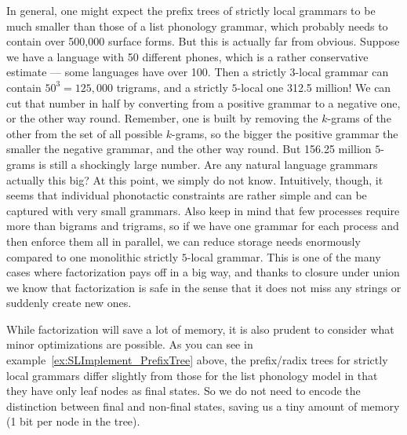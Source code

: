 In general, one might expect the prefix trees of strictly local grammars to be much smaller than those of a list phonology grammar, which probably needs to contain over 500,000 surface forms.
But this is actually far from obvious.
Suppose we have a language with 50 different phones, which is a rather conservative estimate --- some languages have over 100.
Then a strictly $3$-local grammar can contain $50^3 = 125,000$ trigrams, and a strictly $5$-local one 312.5 million!
We can cut that number in half by converting from a positive grammar to a negative one, or the other way round.
Remember, one is built by removing the $k$-grams of the other from the set of all possible $k$-grams, so the bigger the positive grammar the smaller the negative grammar, and the other way round.
But 156.25 million $5$-grams is still a shockingly large number.
Are any natural language grammars actually this big?
At this point, we simply do not know.
Intuitively, though, it seems that individual phonotactic constraints are rather simple and can be captured with very small grammars.
Also keep in mind that few processes require more than bigrams and trigrams, so if we have one grammar for each process and then enforce them all in parallel, we can reduce storage needs enormously compared to one monolithic strictly $5$-local grammar.
This is one of the many cases where factorization pays off in a big way, and thanks to closure under union we know that factorization is safe in the sense that it does not miss any strings or suddenly create new ones.

While factorization will save a lot of memory, it is also prudent to consider what minor optimizations are possible.
As you can see in example~\ref{ex:SLImplement_PrefixTree} above, the prefix\slash radix trees for strictly local grammars differ slightly from those for the list phonology model in that they have only leaf nodes as final states.
So we do not need to encode the distinction between final and non-final states, saving us a tiny amount of memory (1 bit per node in the tree).

